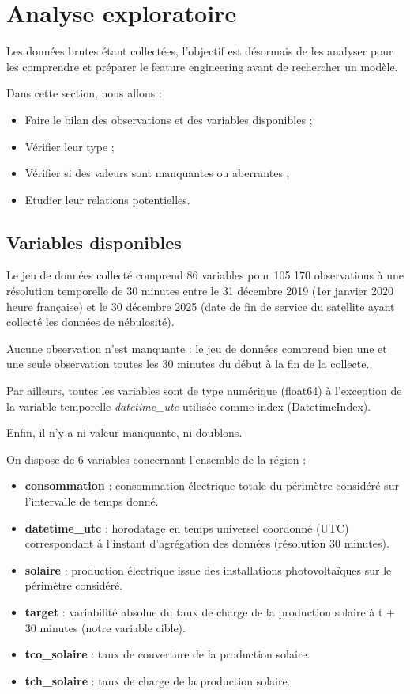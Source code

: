 \chapter{Analyse exploratoire}

Les données brutes étant collectées, l’objectif est désormais de les analyser pour les comprendre et préparer le feature engineering avant de rechercher un modèle.

Dans cette section, nous allons :

\begin{itemize}
\item Faire le bilan des observations et des variables disponibles ;
\item Vérifier leur type ;
\item Vérifier si des valeurs sont manquantes ou aberrantes ;
\item Etudier leur relations potentielles.
\end{itemize}

\section{Variables disponibles}
\label{subsec:var_dispo}

Le jeu de données collecté comprend 86 variables pour 105 170 observations à une résolution temporelle de 30 minutes entre le 31 décembre 2019 (1er janvier 2020 heure française) et le 30 décembre 2025 (date de fin de service du satellite ayant collecté les données de nébulosité).

Aucune observation n’est manquante : le jeu de données comprend bien une et une seule observation toutes les 30 minutes du début à la fin de la collecte.

Par ailleurs, toutes les variables sont de type numérique (float64) à l’exception de la variable temporelle \textit{datetime\_utc} utilisée comme index (DatetimeIndex).

Enfin, il n’y a ni valeur manquante, ni doublons.

On dispose de 6 variables concernant l’ensemble de la région :

\begin{itemize}
\item \textbf{consommation} : consommation électrique totale du périmètre considéré sur l'intervalle de temps donné.
\item \textbf{datetime\_utc} : horodatage en temps universel coordonné (UTC) correspondant à l'instant d'agrégation des données (résolution 30 minutes).
\item \textbf{solaire} : production électrique issue des installations photovoltaïques sur le périmètre considéré.
\item \textbf{target} : variabilité absolue du taux de charge de la production solaire à t + 30 minutes (notre variable cible).
\item \textbf{tco\_solaire} : taux de couverture de la production solaire.
\item \textbf{tch\_solaire} : taux de charge de la production solaire.
\end{itemize}

